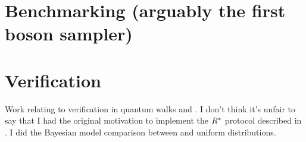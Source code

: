 \section{Benchmarking (arguably the first boson sampler)}

\section{Verification}
Work relating to verification in quantum walks and \bosonsampling. I don't think
it's unfair to say that I had the original motivation to implement the
\(R^{*}\) protocol described in \cite{aaronson13}. I did the Bayesian model
comparison between \bosonsampling and uniform distributions.
